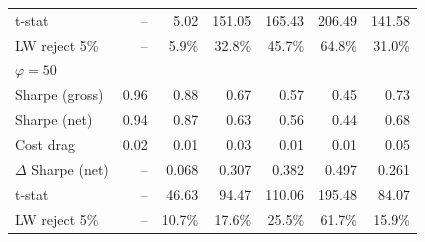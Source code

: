 \begin{tabular*}{\textwidth}{l@{\extracolsep{\fill}}rrrrrr}
t-stat & --\phantom{$^{***}$} & 5.02\phantom{$^{***}$} & 151.05\phantom{$^{***}$} & 165.43\phantom{$^{***}$} & 206.49\phantom{$^{***}$} & 141.58\phantom{$^{***}$} \\
LW reject 5\% & --\phantom{$^{***}$} & 5.9\%\phantom{$^{***}$} & 32.8\%\phantom{$^{***}$} & 45.7\%\phantom{$^{***}$} & 64.8\%\phantom{$^{***}$} & 31.0\%\phantom{$^{***}$} \\
\midrule
\multicolumn{7}{l}{\textit{$\varphi = 50$}} \\
\midrule
Sharpe (gross) & 0.96\phantom{$^{***}$} & 0.88\phantom{$^{***}$} & 0.67\phantom{$^{***}$} & 0.57\phantom{$^{***}$} & 0.45\phantom{$^{***}$} & 0.73\phantom{$^{***}$} \\
Sharpe (net) & 0.94\phantom{$^{***}$} & 0.87\phantom{$^{***}$} & 0.63\phantom{$^{***}$} & 0.56\phantom{$^{***}$} & 0.44\phantom{$^{***}$} & 0.68\phantom{$^{***}$} \\
Cost drag & 0.02\phantom{$^{***}$} & 0.01\phantom{$^{***}$} & 0.03\phantom{$^{***}$} & 0.01\phantom{$^{***}$} & 0.01\phantom{$^{***}$} & 0.05\phantom{$^{***}$} \\
$\Delta$ Sharpe (net) & --\phantom{$^{***}$} & 0.068\rlap{$^{***}$}\phantom{$^{***}$} & 0.307\rlap{$^{***}$}\phantom{$^{***}$} & 0.382\rlap{$^{***}$}\phantom{$^{***}$} & 0.497\rlap{$^{***}$}\phantom{$^{***}$} & 0.261\rlap{$^{***}$}\phantom{$^{***}$} \\
t-stat & --\phantom{$^{***}$} & 46.63\phantom{$^{***}$} & 94.47\phantom{$^{***}$} & 110.06\phantom{$^{***}$} & 195.48\phantom{$^{***}$} & 84.07\phantom{$^{***}$} \\
LW reject 5\% & --\phantom{$^{***}$} & 10.7\%\phantom{$^{***}$} & 17.6\%\phantom{$^{***}$} & 25.5\%\phantom{$^{***}$} & 61.7\%\phantom{$^{***}$} & 15.9\%\phantom{$^{***}$} \\
\bottomrule
\end{tabular*}

